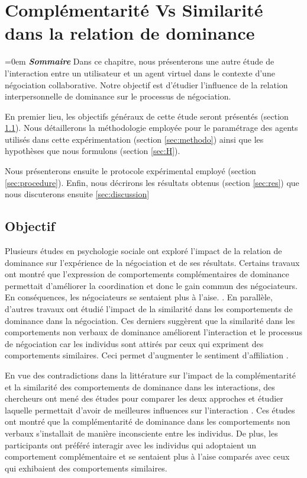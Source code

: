\chapter[Complémentarité Vs Similarité]{Complémentarité Vs Similarité dans la relation de dominance}
\label{chap:chap6}
	\begingroup
	\parindent=0em
	\emph{\textbf{Sommaire}} \vspace{0.5em}
	\localtableofcontents 
	\clearpage
	\endgroup
Dans ce chapitre, nous présenterons une autre étude de l'interaction entre un utilisateur et un agent virtuel dans le contexte d'une négociation collaborative. 
Notre objectif est d'étudier l'influence de la relation interpersonnelle de dominance sur le processus de négociation. 

En premier lieu, les objectifs généraux de cette étude seront présentés (section \ref{sec:obj}). Nous détaillerons la méthodologie employée pour le paramétrage des agents utilisés dans cette expérimentation (section \ref{sec:methodo}) ainsi que les hypothèses que nous formulons (section \ref{sec:H}).

Nous présenterons ensuite le protocole expérimental employé (section \ref{sec:procedure}). Enfin, nous décrirons les résultats obtenus  (section \ref{sec:res})
que nous discuterons ensuite \ref{sec:discussion}
\section{Objectif}
\label{sec:obj}

Plusieurs études en psychologie sociale ont exploré l'impact de la relation de dominance sur l'expérience de la négociation et de ses résultats. Certains travaux ont montré que l'expression de comportements complémentaires de dominance permettait d'améliorer la coordination et donc le gain commun des négociateurs. En conséquences, les négociateurs se sentaient plus à l'aise. \cite{tiedens2003power,wiltermuth2009benefits,olekalns2013dyadic}.
En parallèle, d'autres travaux ont étudié l'impact de la similarité dans les comportements de dominance dans la négociation. Ces derniers suggèrent que la similarité dans les comportements non verbaux de dominance améliorent l'interaction et le processus de négociation car les individus sont attirés par ceux qui expriment des comportements similaires. Ceci permet d'augmenter le sentiment d'affiliation \cite{olekalns2013dyadic}. 

En vue des contradictions dans la littérature sur l'impact de la complémentarité et la similarité des comportements de dominance dans les interactions, des chercheurs ont mené des études pour comparer les deux approches et étudier laquelle permettait d'avoir de meilleures influences sur l'interaction \cite{tiedens2003power,dryer1997opposites}. Ces études ont montré que la complémentarité de dominance dans les comportements non verbaux s'installait de manière inconsciente entre les individus. De plus, les participants ont préféré interagir avec les individus qui adoptaient un comportement complémentaire et se sentaient plus à l'aise comparés avec ceux qui exhibaient des comportements similaires. 


